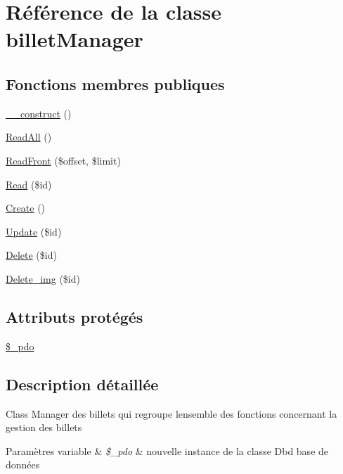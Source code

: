\hypertarget{class_src_1_1_managers_1_1billet_manager}{}\section{Référence de la classe billet\+Manager}
\label{class_src_1_1_managers_1_1billet_manager}
\subsection*{Fonctions membres publiques}
\begin{DoxyCompactItemize}
\item 
\hyperlink{class_src_1_1_managers_1_1billet_manager_a095c5d389db211932136b53f25f39685}{\+\_\+\+\_\+construct} ()
\item 
\hyperlink{class_src_1_1_managers_1_1billet_manager_a24f9f6fa83eb8694eab0a87b2e6ad0b1}{Read\+All} ()
\item 
\hyperlink{class_src_1_1_managers_1_1billet_manager_af7e26a4a8ffd767a1265151f87860ddb}{Read\+Front} (\$offset, \$limit)
\item 
\hyperlink{class_src_1_1_managers_1_1billet_manager_ad2bbc9b3130abdfe3a9fc9e9fe36716f}{Read} (\$id)
\item 
\hyperlink{class_src_1_1_managers_1_1billet_manager_ad01f71fa0ecc039494e3c282864298c3}{Create} ()
\item 
\hyperlink{class_src_1_1_managers_1_1billet_manager_a82232b33fbfacdbdb8a8f49acaecf564}{Update} (\$id)
\item 
\hyperlink{class_src_1_1_managers_1_1billet_manager_a59113b5ecd1d155db6a4f30af34a1e80}{Delete} (\$id)
\item 
\hyperlink{class_src_1_1_managers_1_1billet_manager_a7da0978ffd29442d84e0d4374cb07e8a}{Delete\+\_\+img} (\$id)
\end{DoxyCompactItemize}
\subsection*{Attributs protégés}
\begin{DoxyCompactItemize}
\item 
\hyperlink{class_src_1_1_managers_1_1billet_manager_a1e6d977917b70dce7e26cebad8438bf4}{\$\+\_\+pdo}
\end{DoxyCompactItemize}


\subsection{Description détaillée}
Class Manager des billets qui regroupe l\textquotesingle{}ensemble des fonctions concernant la gestion des billets 
\begin{DoxyParams}[1]{Paramètres}
variable & {\em \$\+\_\+pdo} & nouvelle instance de la classe Dbd base de données \\
\hline
\end{DoxyParams}


